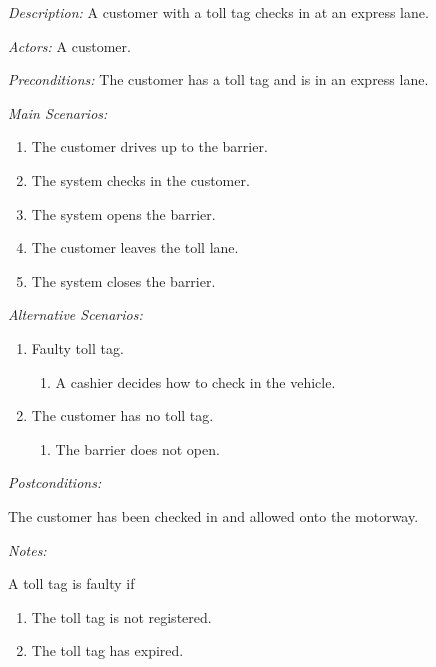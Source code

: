\textit{Description: } A customer with a toll tag checks in at an express lane.

\textit{Actors:} A customer.

\textit{Preconditions:} The customer has a toll tag and is in
an express lane.

\textit{Main Scenarios:}
\begin{enumerate}
\item The customer drives up to the barrier.
\item The system checks in the customer.
\item The system opens the barrier.
\item The customer leaves the toll lane.
\item The system closes the barrier.
\end{enumerate}

\textit{Alternative Scenarios:}
\begin{enumerate}
\item Faulty toll tag.

\begin{enumerate}
\item A cashier decides how to check in the vehicle.
\end{enumerate}
\item The customer has no toll tag.

\begin{enumerate}
\item The barrier does not open.
\end{enumerate}
\end{enumerate}

\textit{Postconditions:}

The customer has been checked in and allowed onto the motorway.

\textit{Notes:}

A toll tag is faulty if
\begin{enumerate}
\item The toll tag is not registered.
\item The toll tag has expired.\end{enumerate}

